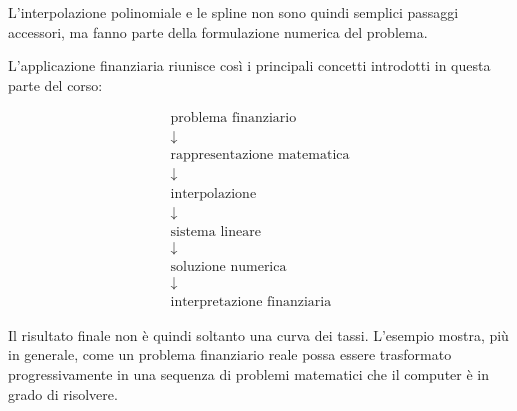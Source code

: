L'interpolazione polinomiale e le spline non sono quindi semplici
passaggi accessori, ma fanno parte della formulazione numerica del
problema.

L'applicazione finanziaria riunisce così i principali concetti
introdotti in questa parte del corso:

\begin{equation*}
\boxed{
\begin{array}{c}
\text{problema finanziario}\\
\downarrow\\
\text{rappresentazione matematica}\\
\downarrow\\
\text{interpolazione}\\
\downarrow\\
\text{sistema lineare}\\
\downarrow\\
\text{soluzione numerica}\\
\downarrow\\
\text{interpretazione finanziaria}
\end{array}}
\end{equation*}

Il risultato finale non è quindi soltanto una curva dei tassi.
L'esempio mostra, più in generale, come un problema finanziario reale
possa essere trasformato progressivamente in una sequenza di problemi
matematici che il computer è in grado di risolvere.

